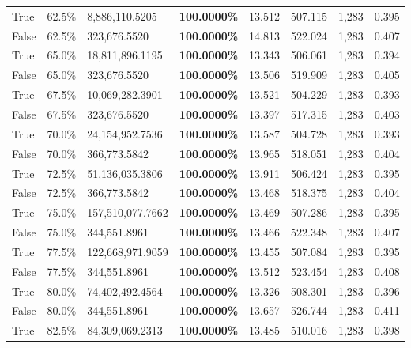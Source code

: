 \begin{table}[H]
\begin{tabular}{lllrllll}
True & 62.5\% & 8,886,110.5205 & \bfseries \color{red} 100.0000\% & 13.512 & 507.115 & 1,283 & 0.395 \\
\cline{1-8}
False & 62.5\% & 323,676.5520 & \bfseries \color{red} 100.0000\% & 14.813 & 522.024 & 1,283 & 0.407 \\
\cline{1-8}
True & 65.0\% & 18,811,896.1195 & \bfseries \color{red} 100.0000\% & 13.343 & 506.061 & 1,283 & 0.394 \\
\cline{1-8}
False & 65.0\% & 323,676.5520 & \bfseries \color{red} 100.0000\% & 13.506 & 519.909 & 1,283 & 0.405 \\
\cline{1-8}
True & 67.5\% & 10,069,282.3901 & \bfseries \color{red} 100.0000\% & 13.521 & 504.229 & 1,283 & 0.393 \\
\cline{1-8}
False & 67.5\% & 323,676.5520 & \bfseries \color{red} 100.0000\% & 13.397 & 517.315 & 1,283 & 0.403 \\
\cline{1-8}
True & 70.0\% & 24,154,952.7536 & \bfseries \color{red} 100.0000\% & 13.587 & 504.728 & 1,283 & 0.393 \\
\cline{1-8}
False & 70.0\% & 366,773.5842 & \bfseries \color{red} 100.0000\% & 13.965 & 518.051 & 1,283 & 0.404 \\
\cline{1-8}
True & 72.5\% & 51,136,035.3806 & \bfseries \color{red} 100.0000\% & 13.911 & 506.424 & 1,283 & 0.395 \\
\cline{1-8}
False & 72.5\% & 366,773.5842 & \bfseries \color{red} 100.0000\% & 13.468 & 518.375 & 1,283 & 0.404 \\
\cline{1-8}
True & 75.0\% & 157,510,077.7662 & \bfseries \color{red} 100.0000\% & 13.469 & 507.286 & 1,283 & 0.395 \\
\cline{1-8}
False & 75.0\% & 344,551.8961 & \bfseries \color{red} 100.0000\% & 13.466 & 522.348 & 1,283 & 0.407 \\
\cline{1-8}
True & 77.5\% & 122,668,971.9059 & \bfseries \color{red} 100.0000\% & 13.455 & 507.084 & 1,283 & 0.395 \\
\cline{1-8}
False & 77.5\% & 344,551.8961 & \bfseries \color{red} 100.0000\% & 13.512 & 523.454 & 1,283 & 0.408 \\
\cline{1-8}
True & 80.0\% & 74,402,492.4564 & \bfseries \color{red} 100.0000\% & 13.326 & 508.301 & 1,283 & 0.396 \\
\cline{1-8}
False & 80.0\% & 344,551.8961 & \bfseries \color{red} 100.0000\% & 13.657 & 526.744 & 1,283 & 0.411 \\
\cline{1-8}
True & 82.5\% & 84,309,069.2313 & \bfseries \color{red} 100.0000\% & 13.485 & 510.016 & 1,283 & 0.398 \\

\end{tabular}
\end{table}

